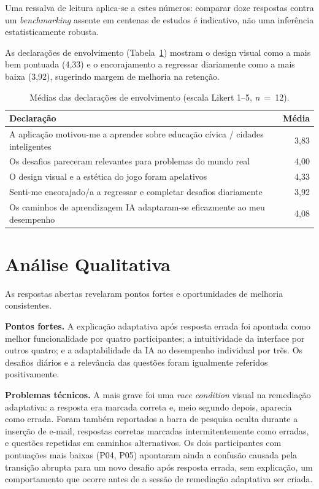 Uma ressalva de leitura aplica-se a estes números: comparar doze respostas contra um \textit{benchmarking} assente em centenas de estudos é indicativo, não uma inferência estatisticamente robusta.

As declarações de envolvimento (Tabela~\ref{tab:sus-engagement}) mostram o design visual como a mais bem pontuada (4,33) e o encorajamento a regressar diariamente como a mais baixa (3,92), sugerindo margem de melhoria na retenção.

\begin{table}[htb]
\centering
\caption{Médias das declarações de envolvimento (escala Likert 1–5, \textit{n}~=~12).}
\label{tab:sus-engagement}
\begin{tabular}{@{}lr@{}}
\toprule
\textbf{Declaração} & \textbf{Média} \\
\midrule
A aplicação motivou-me a aprender sobre educação cívica / cidades inteligentes & 3,83 \\
Os desafios pareceram relevantes para problemas do mundo real                  & 4,00 \\
O design visual e a estética do jogo foram apelativos                         & 4,33 \\
Senti-me encorajado/a a regressar e completar desafios diariamente            & 3,92 \\
\midrule
Os caminhos de aprendizagem IA adaptaram-se eficazmente ao meu desempenho     & 4,08 \\
\bottomrule
\end{tabular}
\end{table}

\section{Análise Qualitativa} \label{sec:usab-qualitativa}

As respostas abertas revelaram pontos fortes e oportunidades de melhoria consistentes.

\textbf{Pontos fortes.} A explicação adaptativa após resposta errada foi apontada como melhor funcionalidade por quatro participantes; a intuitividade da interface por outros quatro; e a adaptabilidade da IA ao desempenho individual por três. Os desafios diários e a relevância das questões foram igualmente referidos positivamente.

\textbf{Problemas técnicos.} A mais grave foi uma \textit{race condition} visual na remediação adaptativa: a resposta era marcada correta e, meio segundo depois, aparecia como errada. Foram também reportados a barra de pesquisa oculta durante a inserção de e-mail, respostas corretas marcadas intermitentemente como erradas, e questões repetidas em caminhos alternativos. Os dois participantes com pontuações mais baixas (P04, P05) apontaram ainda a confusão causada pela transição abrupta para um novo desafio após resposta errada, sem explicação, um comportamento que ocorre antes de a sessão de remediação adaptativa ser criada.

